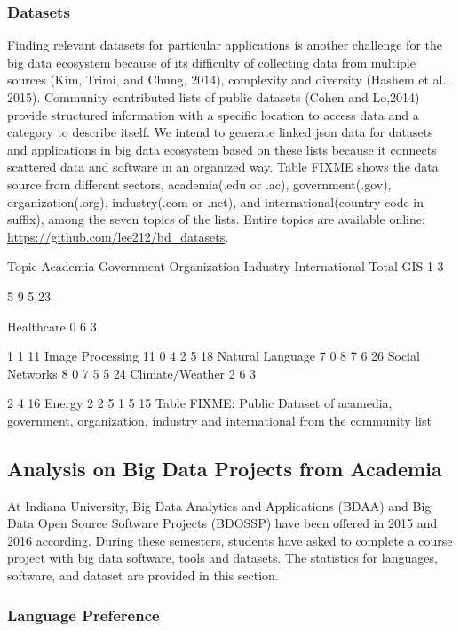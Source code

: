 \documentclass[9pt,twocolumn,twoside]{styles/osajnl}
\begin{document}
\subsubsection{Datasets }

Finding relevant datasets for particular applications is another
challenge for the big data ecosystem because of its difficulty of
collecting data from multiple sources (Kim, Trimi, and Chung, 2014),
complexity and diversity (Hashem et al., 2015). Community contributed
lists of public datasets (Cohen and Lo,2014) provide structured
information with a specific location to access data and a category to
describe itself. We intend to generate linked json data for datasets
and applications in big data ecosystem based on these lists because it
connects scattered data and software in an organized way. Table FIXME
shows the data source from different sectors, academia(.edu or .ac),
government(.gov), organization(.org), industry(.com or .net), and
international(country code in suffix), among the seven topics of the
lists. Entire topics are available online:
\url{https://github.com/lee212/bd_datasets}.


Topic
	Academia
	Government
	Organization
	Industry
	International
	Total
	GIS
	1
	3

	5
	9
	5
	23

	Healthcare
	0
	6
	3

	1
	1
	11
	Image Processing
	11
	0
	4
	2
	5
	18
	Natural Language
	7
	0
	8
	7
	6
	26
	Social Networks
	8
	0
	7
	5
	5
	24
	Climate/Weather
	2
	6
	3

	2
	4
	16
	Energy
	2
	2
	5
	1
	5
	15
	Table FIXME:  Public Dataset of acamedia, government, organization, industry and international from the community list

\subsection{Analysis on Big Data Projects from Academia}

At Indiana University, Big Data Analytics and Applications (BDAA) and
Big Data Open Source Software Projects (BDOSSP) have been offered in
2015 and 2016 according. During these semesters, students have asked
to complete a course project with big data software, tools and
datasets. The statistics for languages, software, and dataset are
provided in this section.


\subsubsection{Language Preference}
\end{document}
